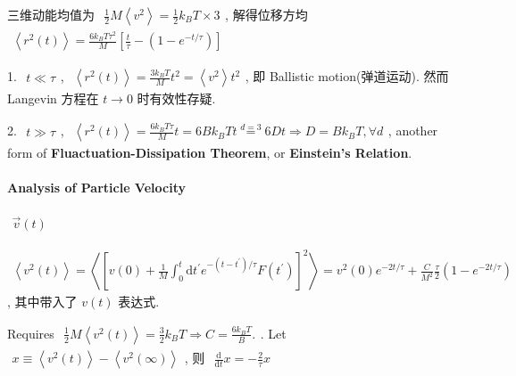 \documentclass[../../main.tex]{subfiles}
\begin{document}
三维动能均值为 $\begin{aligned}
    \frac{1}{2}M\left\langle v^{2}\right\rangle = \frac{1}{2}k_{B}T\times 3
\end{aligned}$, 解得位移方均 $\begin{aligned}
    \left\langle r^{2}(t)\right\rangle = \frac{6k_{B}T\tau^{2}}{M}\left[\frac{t}{\tau} - \left(1-e^{-t/\tau}\right)\right]
\end{aligned}$

1. $\begin{aligned}
    t\ll \tau
\end{aligned}$, $\begin{aligned}
     \left\langle r^{2}(t)\right\rangle = \frac{3k_{B}T}{M}t^{2} = \left\langle v^{2}\right\rangle t^{2}
\end{aligned}$, 即 Ballistic motion(弹道运动). 然而 Langevin 方程在 $t\rightarrow 0$ 时有效性存疑. 

2. $\begin{aligned}
    t\gg\tau
\end{aligned}$, $\begin{aligned}
    \left\langle r^{2}(t)\right\rangle = \frac{6k_{B}T\tau}{M}t = 6Bk_{B}Tt \stackrel{d=3}{=} 6Dt\Rightarrow \boxed{D = Bk_{B}T},\forall d
\end{aligned}$, another form of \textbf{Fluactuation-Dissipation Theorem}, or \textbf{Einstein's Relation}.

\paragraph{Analysis of Particle Velocity} $\begin{aligned}
    \vec{v}(t)
\end{aligned}$

$\begin{aligned}
    \left\langle v^{2}(t)\right\rangle = \left\langle\left[ v(0) +\frac{1}{M}\int_{0}^{t}\mathrm{d}t^{\prime}e^{-\left(t-t^{\prime}\right)/\tau}F\left(t^{\prime}\right)\right]^{2}\right\rangle = v^{2}(0) e^{-2t/\tau} + \frac{C}{M^{2}}\frac{\tau}{2}\left(1-e^{-2t/\tau}\right)
\end{aligned}$, 其中带入了 $v(t)$ 表达式. 

Requires $\begin{aligned}
    \frac{1}{2}M\left\langle v^{2}(t)\right\rangle = \frac{3}{2}k_{B}T\Rightarrow C = \frac{6k_{B}T}{B}.
\end{aligned}$. Let $\begin{aligned}
    x\equiv \left\langle v^{2}(t)\right\rangle - \left\langle v^{2}(\infty)\right\rangle
\end{aligned}$, 则 $\begin{aligned}
    \frac{\mathrm{d}}{\mathrm{d}t} x = -\frac{2}{\tau} x
\end{aligned}$
\end{document}
